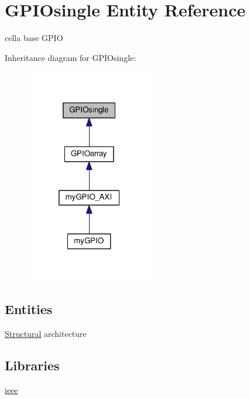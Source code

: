 \hypertarget{class_g_p_i_osingle}{\section{G\+P\+I\+Osingle Entity Reference}
\label{class_g_p_i_osingle}
}


cella base G\+P\+I\+O  




Inheritance diagram for G\+P\+I\+Osingle\+:
\nopagebreak
\begin{figure}[H]
\begin{center}
\leavevmode
\includegraphics[width=157pt]{class_g_p_i_osingle__inherit__graph}
\end{center}
\end{figure}
\subsection*{Entities}
\begin{DoxyCompactItemize}
\item 
\hyperlink{class_g_p_i_osingle_1_1_structural}{Structural} architecture
\end{DoxyCompactItemize}
\subsection*{Libraries}
 \begin{DoxyCompactItemize}
\item 
\hypertarget{class_g_p_i_osingle_ga0a6af6eef40212dbaf130d57ce711256}{\hyperlink{group__my_g_p_i_o_ga0a6af6eef40212dbaf130d57ce711256}{ieee} }\label{class_g_p_i_osingle_ga0a6af6eef40212dbaf130d57ce711256}

\end{DoxyCompactItemize}
